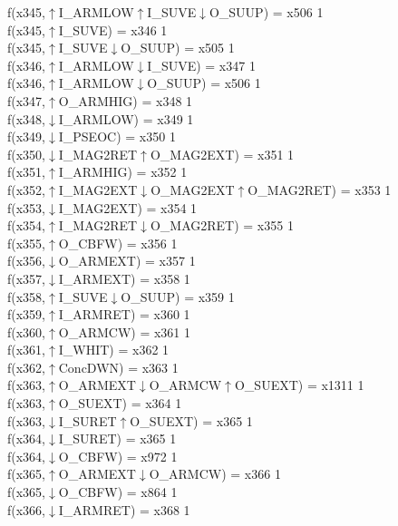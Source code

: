 f(x345,$\uparrow$I\_ARMLOW$\uparrow$I\_SUVE$\downarrow$O\_SUUP) = x506 {1} \\
f(x345,$\uparrow$I\_SUVE) = x346 {1} \\
f(x345,$\uparrow$I\_SUVE$\downarrow$O\_SUUP) = x505 {1} \\
f(x346,$\uparrow$I\_ARMLOW$\downarrow$I\_SUVE) = x347 {1} \\
f(x346,$\uparrow$I\_ARMLOW$\downarrow$O\_SUUP) = x506 {1} \\
f(x347,$\uparrow$O\_ARMHIG) = x348 {1} \\
f(x348,$\downarrow$I\_ARMLOW) = x349 {1} \\
f(x349,$\downarrow$I\_PSEOC) = x350 {1} \\
f(x350,$\downarrow$I\_MAG2RET$\uparrow$O\_MAG2EXT) = x351 {1} \\
f(x351,$\uparrow$I\_ARMHIG) = x352 {1} \\
f(x352,$\uparrow$I\_MAG2EXT$\downarrow$O\_MAG2EXT$\uparrow$O\_MAG2RET) = x353 {1} \\
f(x353,$\downarrow$I\_MAG2EXT) = x354 {1} \\
f(x354,$\uparrow$I\_MAG2RET$\downarrow$O\_MAG2RET) = x355 {1} \\
f(x355,$\uparrow$O\_CBFW) = x356 {1} \\
f(x356,$\downarrow$O\_ARMEXT) = x357 {1} \\
f(x357,$\downarrow$I\_ARMEXT) = x358 {1} \\
f(x358,$\uparrow$I\_SUVE$\downarrow$O\_SUUP) = x359 {1} \\
f(x359,$\uparrow$I\_ARMRET) = x360 {1} \\
f(x360,$\uparrow$O\_ARMCW) = x361 {1} \\
f(x361,$\uparrow$I\_WHIT) = x362 {1} \\
f(x362,$\uparrow$ConcDWN) = x363 {1} \\
f(x363,$\uparrow$O\_ARMEXT$\downarrow$O\_ARMCW$\uparrow$O\_SUEXT) = x1311 {1} \\
f(x363,$\uparrow$O\_SUEXT) = x364 {1} \\
f(x363,$\downarrow$I\_SURET$\uparrow$O\_SUEXT) = x365 {1} \\
f(x364,$\downarrow$I\_SURET) = x365 {1} \\
f(x364,$\downarrow$O\_CBFW) = x972 {1} \\
f(x365,$\uparrow$O\_ARMEXT$\downarrow$O\_ARMCW) = x366 {1} \\
f(x365,$\downarrow$O\_CBFW) = x864 {1} \\
f(x366,$\downarrow$I\_ARMRET) = x368 {1} \\
